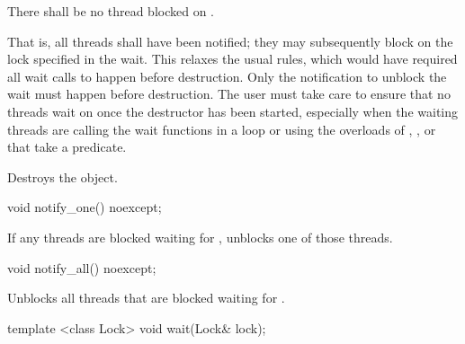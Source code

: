 \begin{itemdescr}
\pnum
\requires There shall be no thread blocked on . \begin{note} That is, all
threads shall have been notified; they may subsequently block on the lock specified in the
wait.
This relaxes the usual rules, which would have required all wait calls to happen before
destruction. Only the notification to unblock the wait must happen before destruction.
The user must take care to ensure that no threads wait on  once the destructor has
been started, especially when the waiting threads are calling the wait functions in a loop or
using the overloads of , , or  that take a predicate.
\end{note}

\pnum\effects Destroys the object.
\end{itemdescr}

%
\begin{itemdecl}
void notify_one() noexcept;
\end{itemdecl}

\begin{itemdescr}
\pnum\effects If any threads are blocked waiting for , unblocks one of those threads.
\end{itemdescr}

%
\begin{itemdecl}
void notify_all() noexcept;
\end{itemdecl}

\begin{itemdescr}
\pnum\effects Unblocks all threads that are blocked waiting for .
\end{itemdescr}

%
\begin{itemdecl}
template <class Lock>
  void wait(Lock& lock);
\end{itemdecl}

